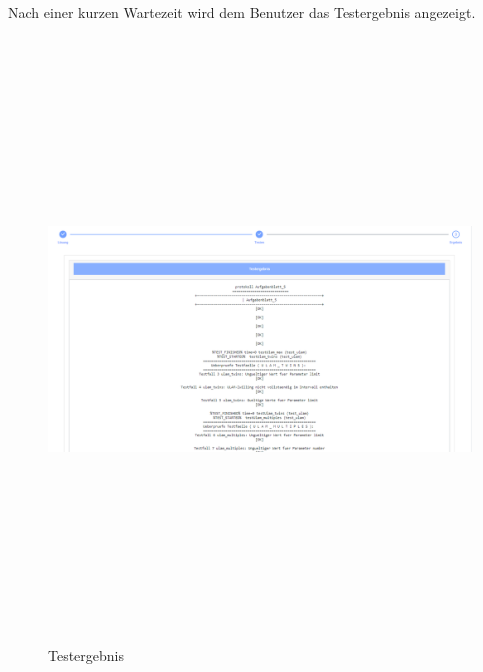 \documentclass[a4paper,12pt,oneside]{book}
\begin{document}
\newpage
Nach einer kurzen Wartezeit wird dem Benutzer das Testergebnis angezeigt.
\begin{figure}[h!]
	\begin{center}
		\includegraphics[width=16cm, height=16cm]{Testergebnis.PNG}
		\caption{Testergebnis} 
		\label{Testergebnis} 
	\end{center}
\end{figure}
\end{document}
